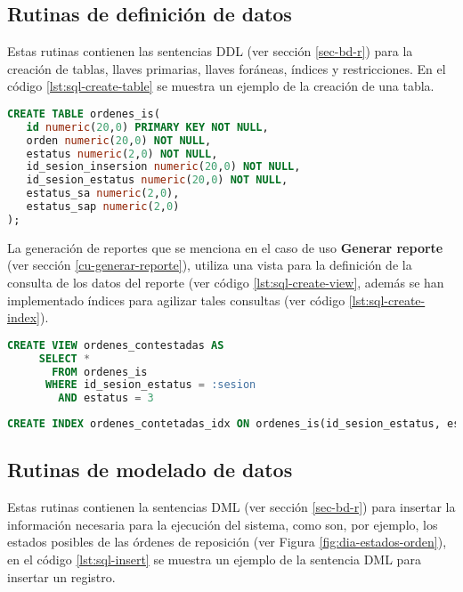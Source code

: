 \subsection{Rutinas de definición de datos}
Estas rutinas contienen las sentencias DDL (ver sección \ref{sec-bd-r}) para la creación de tablas, llaves primarias, llaves foráneas, índices y restricciones. En el código \ref{lst:sql-create-table} se muestra un ejemplo de la creación de una tabla.
\begin{lstlisting}[language=SQL, caption={Sentencia para crear una tabla.}, label={lst:sql-create-table}]
CREATE TABLE ordenes_is(
   id numeric(20,0) PRIMARY KEY NOT NULL,
   orden numeric(20,0) NOT NULL,
   estatus numeric(2,0) NOT NULL,
   id_sesion_insersion numeric(20,0) NOT NULL,
   id_sesion_estatus numeric(20,0) NOT NULL,
   estatus_sa numeric(2,0),
   estatus_sap numeric(2,0)
);
\end{lstlisting}

La generación de reportes que se menciona en el caso de uso \textbf{Generar reporte} (ver sección \ref{cu-generar-reporte}), utiliza una vista para la definición de la consulta de los datos del reporte (ver código \ref{lst:sql-create-view}, además se han implementado índices para agilizar tales consultas (ver código \ref{lst:sql-create-index}).

\begin{lstlisting}[language=SQL, caption={Sentencia para crear una vista.}, label={lst:sql-create-view}]
CREATE VIEW ordenes_contestadas AS
     SELECT *
       FROM ordenes_is
      WHERE id_sesion_estatus = :sesion
        AND estatus = 3
\end{lstlisting}

\begin{lstlisting}[language=SQL, caption={Sentencia para crear un índice.}, label={lst:sql-create-index}]
CREATE INDEX ordenes_contetadas_idx ON ordenes_is(id_sesion_estatus, estatus);
\end{lstlisting}

\subsection{Rutinas de modelado de datos}
Estas rutinas contienen la sentencias DML (ver sección \ref{sec-bd-r}) para insertar la información necesaria para la ejecución del sistema, como son, por ejemplo, los estados posibles de las órdenes de reposición (ver Figura \ref{fig:dia-estados-orden}), en el código \ref{lst:sql-insert} se muestra un ejemplo de la sentencia DML para insertar un registro.

